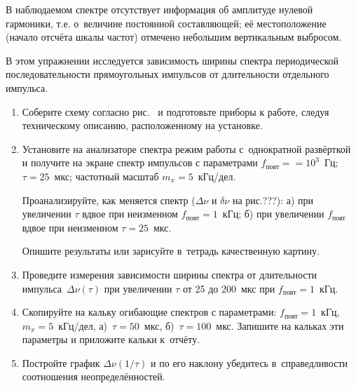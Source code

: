 В наблюдаемом спектре отсутствует информация об амплитуде нулевой гармоники,
т.е. о~величине постоянной составляющей; её местоположение (начало отсчёта шкалы
частот) отмечено небольшим вертикальным выбросом.

\begin{lab:task}

В этом упражнении исследуется зависимость ширины спектра периодической
последовательности прямоугольных импульсов от длительности отдельного импульса.

\begin{enumerate}
\item Соберите схему согласно рис.~ и
подготовьте приборы к работе, следуя техническому описанию, расположенному на
установке.

\item Установите на анализаторе спектра режим работы с~однократной
развёрткой и получите на экране спектр импульсов с параметрами
$f_\text{повт}==10^3$~Гц; $\tau=25$~мкс; частотный масштаб $m_x=5$~кГц/дел.

Проанализируйте, как меняется спектр ($\Delta\nu$ и $\delta\nu$ на
рис.???):
а) при увеличении $\tau$ вдвое при неизменном $f_\text{повт}=1$~кГц;
б) при увеличении $f_\text{повт}$ вдвое при неизменном $\tau=25$~мкс.

Опишите результаты или зарисуйте в~тетрадь качественную картину.

\item Проведите измерения зависимости ширины спектра от длительности
импульса~$\Delta \nu(\tau)$ при увеличении $\tau$ от 25 до 200~мкс при
$f_\text{повт}=1$~кГц.

\item Скопируйте на кальку  огибающие спектров с параметрами:
$f_\text{повт}=1$~кГц, $m_x=5$~кГц/дел, а)~$\tau=50$~мкс, б)~$\tau=100$~мкс.
Запишите на кальках эти параметры и приложите кальки к~отчёту.

\item Постройте график $\Delta \nu(1/\tau)$ и по его наклону убедитесь
в~справедливости соотношения неопределённостей.
\end{enumerate}
\end{lab:task}



